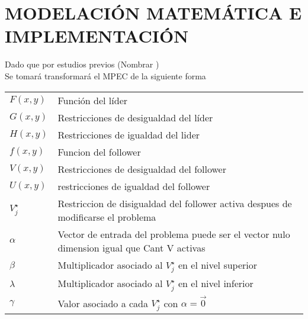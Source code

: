 \chapter{MODELACIÓN MATEMÁTICA E IMPLEMENTACIÓN}

Dado que por estudios previos (Nombrar )\\

Se tomará transformará el MPEC de la siguiente forma


\begin{table}[H]
    \begin{tabular}{l m{360pt}}
        $ F(x,y) $              & Función del líder                                                                                                          \\
        $ G(x,y) $              & Restricciones de desigualdad del líder                                                                                                            \\
        $ H(x,y) $                 & Restricciones de igualdad del lider                       \\
        $ f(x,y) $           & Funcion del follower                                                               \\
        $ V(x,y) $              &  Restricciones de desigualdad del follower  \\
        $ U(x,y) $     & restricciones de igualdad del follower\\
        $ V_{j}^{\star} $    & Restriccion de disigualdad del follower activa despues de modificarse el problema            \\
        $ \alpha  $             & Vector de entrada del problema puede ser el vector nulo  dimension igual que Cant V activas                                                                                                        \\
        $ \beta $               & Multiplicador asociado al $V_{j}^{\star}$ en el nivel superior          \\
        $ \lambda $              & Multiplicador asociado al $V_{j}^{\star}$ en el nivel inferior\\
        $\gamma$                & Valor asociado a cada $V_{j}^{\star}$ con $\alpha=\vec{0}$\\
    \end{tabular}

    \end{table}

